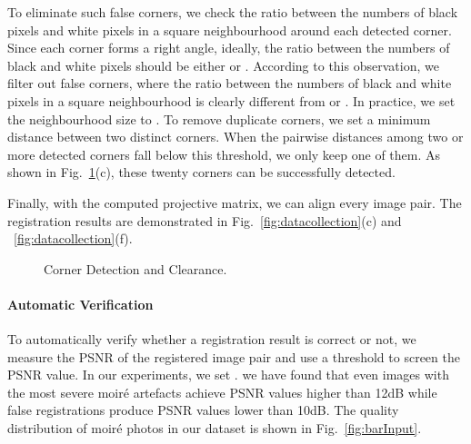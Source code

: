 \documentclass[journal]{IEEEtran}
\begin{document}
To eliminate such false corners, we check the ratio between the numbers of black pixels and white pixels in a square neighbourhood around each detected corner. Since each corner forms a right angle, ideally, the ratio between the numbers of black and white pixels should be either  or . According to this observation, we filter out false corners, where the ratio between the numbers of black and white pixels in a square neighbourhood is clearly different from  or . In practice, we set the neighbourhood size to . To remove duplicate corners, we set a minimum distance between two distinct corners. When the pairwise distances among two or more detected corners fall below this threshold, we only keep one of them. As shown in Fig.~\ref{fig:cornerdetection}(c), these twenty corners can be successfully detected. 

Finally, with the computed projective matrix, we can align every image pair.  The registration results are demonstrated in Fig.~\ref{fig:datacollection}(c) and ~\ref{fig:datacollection}(f).


\begin{figure}[t]
\begin{center}
\hspace{-0.5em}
\hspace{-0.5em}
\end{center}
\vspace{-1.5em}
\addtocounter{subfigure}{-3}
\begin{center}
\hspace{-0.5em}
\hspace{-0.5em}
\end{center}

\caption{Corner Detection and Clearance.}
\label{fig:cornerdetection}
\end{figure}



\paragraph{Automatic Verification} To automatically verify whether a registration result is correct or not, we measure the PSNR of the registered image pair and use a threshold  to screen the PSNR value. In our experiments, we set . we have found that even images with the most severe moir\'{e} artefacts achieve PSNR values higher than 12dB while false registrations produce PSNR values lower than 10dB. The quality distribution of moir\'{e} photos in our dataset is shown in Fig.~\ref{fig:barInput}.
\end{document}
